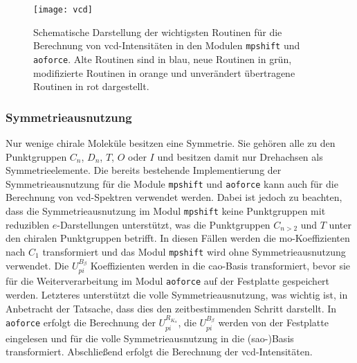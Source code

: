 	 
\vfill
\newpage	
\begin{figure}[ht!]
	\centering
	\texttt{[image: vcd]}
	\captionsetup{figurewithin = chapter}
	\captionsetup{font=small, labelfont=bf}\caption[Wichtigste Routinen für die Berechnung von VCD-Intensitäten]{Schematische Darstellung der wichtigsten Routinen für die Berechnung von \ac{vcd}-Intensitäten in den Modulen \texttt{mpshift} und \texttt{aoforce}. Alte Routinen sind in blau, neue Routinen in grün, modifizierte Routinen in orange und unverändert übertragene Routinen in rot dargestellt.}
\label{abb:programmstrukur_vcd}
\end{figure}
	
\FloatBarrier
\vfill
\newpage
	\subsubsection{Symmetrieausnutzung}
	Nur wenige chirale Moleküle besitzen eine Symmetrie. Sie gehören alle zu den Punktgruppen $C_n$, $D_n$, $T$, $O$ oder $I$ und besitzen damit nur Drehachsen als Symmetrieelemente. Die bereits bestehende Implementierung der Symmetrieausnutzung\supercite{haser1991molecular} für die Module \texttt{mpshift} und \texttt{aoforce} kann auch für die Berechnung von \ac{vcd}-Spektren verwendet werden. Dabei ist jedoch zu beachten, dass die Symmetrieausnutzung im Modul \texttt{mpshift} keine Punktgruppen mit reduziblen $e$-Darstellungen unterstützt, was die Punktgruppen $C_{n>2}$ und $T$ unter den chiralen Punktgruppen betrifft. In diesen Fällen werden die \ac{mo}-Koeffizienten nach $C_1$ transformiert und das Modul \texttt{mpshift} wird ohne Symmetrieausnutzung verwendet. Die $U_{pi}^{B_\beta}$ Koeffizienten werden in die \ac{cao}-Basis transformiert, bevor sie für die Weiterverarbeitung im Modul \texttt{aoforce} auf der Festplatte gespeichert werden. Letzteres unterstützt die volle Symmetrieausnutzung, was wichtig ist, in Anbetracht der Tatsache, dass dies den zeitbestimmenden Schritt darstellt. In \texttt{aoforce} erfolgt die Berechnung der $U_{pi}^{R_{K_\alpha}}$, die $U_{pi}^{B_\beta}$ werden von der Festplatte eingelesen und für die volle Symmetrieausnutzung in die \mbox{(\acs{sao}-)}Basis transformiert. Abschließend erfolgt die Berechnung der \ac{vcd}-Intensitäten.
	
